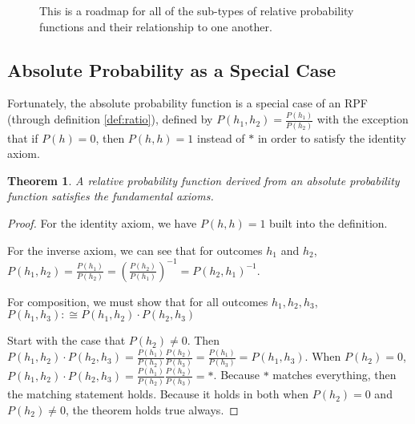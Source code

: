 \documentclass[twoside]{article}
\theoremstyle{plain}%
\newtheorem{theorem}{Theorem}[section]
\theoremstyle{definition}
\theoremstyle{remark}
\begin{document}
\begin{figure}
\caption{This is a roadmap for all of the sub-types of relative probability functions and their relationship to one another. }
\label{fig:flow_chart}
\end{figure}

\subsection{Absolute Probability as a Special Case}

Fortunately, the absolute probability function is a special case of an RPF (through definition \ref{def:ratio}), defined by \(P(h_1, h_2) = \frac{P(h_1)}{P(h_2)}\) with the exception that if \(P(h) = 0\), then \(P(h, h) = 1\) instead of \(\ast\) in order to satisfy the identity axiom.

\begin{theorem}
A relative probability function derived from an absolute probability function satisfies the fundamental axioms.
\end{theorem}

\begin{proof}
For the identity axiom, we have \(P(h, h) = 1\) built into the definition.

For the inverse axiom, we can see that for outcomes \(h_1\) and \(h_2\), \(P(h_1, h_2) = \frac{P(h_1)}{P(h_2)} = \left(\frac{P(h_2)}{P(h_1)}\right)^{-1} = P(h_2, h_1)^{-1}\).

For composition, we must show that for all outcomes \(h_1, h_2, h_3\), \(P(h_1, h_3) :\cong P(h_1, h_2) \cdot P(h_2, h_3)\)

Start with the case that \(P(h_2)\neq 0\). Then \(P(h_1, h_2) \cdot P(h_2, h_3) = \frac{P(h_1)}{P(h_2)}\frac{P(h_2)}{P(h_3)} = \frac{P(h_1)}{P(h_3)} = P(h_1, h_3)\). When \(P(h_2) = 0\), \(P(h_1, h_2) \cdot P(h_2, h_3) = \frac{P(h_1)}{P(h_2)}\frac{P(h_2)}{P(h_3)} = \ast\). Because \(\ast\) matches everything, then the matching statement holds. Because it holds in both when \(P(h_2) = 0\) and \(P(h_2) \neq 0\), the theorem holds true always.
\end{proof}
\end{document}
